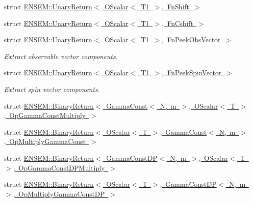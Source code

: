 \begin{DoxyCompactItemize}
\item 
struct \mbox{\hyperlink{structENSEM_1_1UnaryReturn_3_01OScalar_3_01T1_01_4_00_01FnShift_01_4}{E\+N\+S\+E\+M\+::\+Unary\+Return$<$ O\+Scalar$<$ T1 $>$, Fn\+Shift $>$}}
\item 
struct \mbox{\hyperlink{structENSEM_1_1UnaryReturn_3_01OScalar_3_01T1_01_4_00_01FnCshift_01_4}{E\+N\+S\+E\+M\+::\+Unary\+Return$<$ O\+Scalar$<$ T1 $>$, Fn\+Cshift $>$}}
\item 
struct \mbox{\hyperlink{structENSEM_1_1UnaryReturn_3_01OScalar_3_01T1_01_4_00_01FnPeekObsVector_01_4}{E\+N\+S\+E\+M\+::\+Unary\+Return$<$ O\+Scalar$<$ T1 $>$, Fn\+Peek\+Obs\+Vector $>$}}
\begin{DoxyCompactList}\small\item\em Extract observable vector components. \end{DoxyCompactList}\item 
struct \mbox{\hyperlink{structENSEM_1_1UnaryReturn_3_01OScalar_3_01T1_01_4_00_01FnPeekSpinVector_01_4}{E\+N\+S\+E\+M\+::\+Unary\+Return$<$ O\+Scalar$<$ T1 $>$, Fn\+Peek\+Spin\+Vector $>$}}
\begin{DoxyCompactList}\small\item\em Extract spin vector components. \end{DoxyCompactList}\item 
struct \mbox{\hyperlink{structENSEM_1_1BinaryReturn_3_01GammaConst_3_01N_00_01m_01_4_00_01OScalar_3_01T_01_4_00_01OpGammaConstMultiply_01_4}{E\+N\+S\+E\+M\+::\+Binary\+Return$<$ Gamma\+Const$<$ N, m $>$, O\+Scalar$<$ T $>$, Op\+Gamma\+Const\+Multiply $>$}}
\item 
struct \mbox{\hyperlink{structENSEM_1_1BinaryReturn_3_01OScalar_3_01T_01_4_00_01GammaConst_3_01N_00_01m_01_4_00_01OpMultiplyGammaConst_01_4}{E\+N\+S\+E\+M\+::\+Binary\+Return$<$ O\+Scalar$<$ T $>$, Gamma\+Const$<$ N, m $>$, Op\+Multiply\+Gamma\+Const $>$}}
\item 
struct \mbox{\hyperlink{structENSEM_1_1BinaryReturn_3_01GammaConstDP_3_01N_00_01m_01_4_00_01OScalar_3_01T_01_4_00_01OpGammaConstDPMultiply_01_4}{E\+N\+S\+E\+M\+::\+Binary\+Return$<$ Gamma\+Const\+D\+P$<$ N, m $>$, O\+Scalar$<$ T $>$, Op\+Gamma\+Const\+D\+P\+Multiply $>$}}
\item 
struct \mbox{\hyperlink{structENSEM_1_1BinaryReturn_3_01OScalar_3_01T_01_4_00_01GammaConstDP_3_01N_00_01m_01_4_00_01OpMultiplyGammaConstDP_01_4}{E\+N\+S\+E\+M\+::\+Binary\+Return$<$ O\+Scalar$<$ T $>$, Gamma\+Const\+D\+P$<$ N, m $>$, Op\+Multiply\+Gamma\+Const\+D\+P $>$}}
\item 

\end{DoxyCompactItemize}
